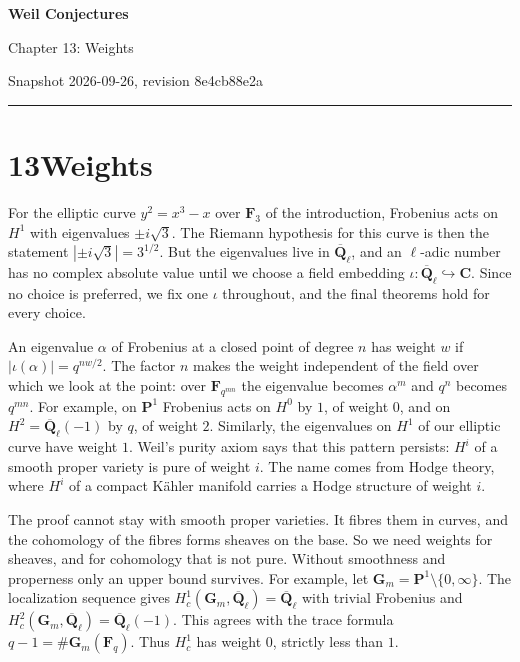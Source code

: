 \documentclass[11pt]{article}
\begin{document}
\pagestyle{plain}
\begin{center}
{\LARGE\bfseries Weil Conjectures\par}
\vspace{0.7em}
{\large Chapter 13: Weights\par}
\vspace{0.5em}
{\small\color{bpmuted}Snapshot 2026-09-26, revision 8e4cb88e2a\par}
\end{center}
\vspace{0.5em}
{\small\tableofcontents}
\bigskip\hrule\bigskip

\section*{\texorpdfstring{13\quad Weights}{13 Weights}}
\label{bp1}%
\label{bp2}%
For the elliptic curve \(y^2=x^3-x\) over \(\mathbf F_3\) of the introduction, Frobenius acts on \(H^1\) with eigenvalues \(\pm i\sqrt3\). The Riemann hypothesis for this curve is then the statement \(|\pm i\sqrt3|=3^{1/2}\). But the eigenvalues live in \(\overline{\mathbf Q}_\ell\), and an \(\ell\)-adic number has no complex absolute value until we choose a field embedding \(\iota:\overline{\mathbf Q}_\ell\hookrightarrow\mathbf C\). Since no choice is preferred, we fix one \(\iota\) throughout, and the final theorems hold for every choice.

An eigenvalue \(\alpha\) of Frobenius at a closed point of degree \(n\) has weight \(w\) if \(|\iota(\alpha)|=q^{nw/2}\). The factor \(n\) makes the weight independent of the field over which we look at the point: over \(\mathbf F_{q^{mn}}\) the eigenvalue becomes \(\alpha^m\) and \(q^n\) becomes \(q^{mn}\). For example, on \(\mathbf P^1\) Frobenius acts on \(H^0\) by \(1\), of weight \(0\), and on \(H^2=\overline{\mathbf Q}_\ell(-1)\) by \(q\), of weight \(2\). Similarly, the eigenvalues on \(H^1\) of our elliptic curve have weight \(1\). Weil's purity axiom says that this pattern persists: \(H^i\) of a smooth proper variety is pure of weight \(i\). The name comes from Hodge theory, where \(H^i\) of a compact Kähler manifold carries a Hodge structure of weight \(i\).

The proof cannot stay with smooth proper varieties. It fibres them in curves, and the cohomology of the fibres forms sheaves on the base. So we need weights for sheaves, and for cohomology that is not pure. Without smoothness and properness only an upper bound survives. For example, let \(\mathbf G_m=\mathbf P^1\setminus\{0,\infty\}\). The localization sequence gives \(H^1_c(\mathbf G_m,\overline{\mathbf Q}_\ell)=\overline{\mathbf Q}_\ell\) with trivial Frobenius and \(H^2_c(\mathbf G_m,\overline{\mathbf Q}_\ell)=\overline{\mathbf Q}_\ell(-1)\). This agrees with the trace formula \(q-1=\#\mathbf G_m(\mathbf F_q)\). Thus \(H^1_c\) has weight \(0\), strictly less than \(1\).
\end{document}
